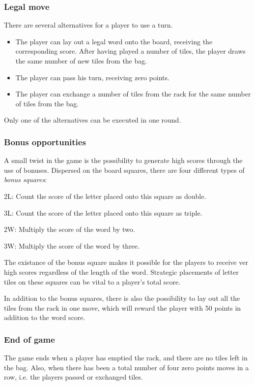 \documentclass[a4paper, 12pt]{report}
\begin{document}
\subsubsection{Legal move}
There are several alternatives for a player to use a turn. 
\begin{itemize}
\item The player can lay out a legal word onto the board, receiving the corresponding score. After having played a number of tiles, the player draws the same number of new tiles from the bag.
\item The player can pass his turn, receiving zero points.
\item The player can exchange a number of tiles from the rack for the same number of tiles from the bag.
\end{itemize}

Only one of the alternatives can be executed in one round.

\subsubsection{Bonus opportunities}
A small twist in the game is the possibility to generate high scores through the use of bonuses. Dispersed on the board squares, there are four different types of \emph{bonus squares}:

\begin{description}
\item{2L:} Count the score of the letter placed onto this square as double.
\item{3L:} Count the score of the letter placed onto this square as triple.
\item{2W:} Multiply the score of the word by two.
\item{3W:} Multiply the score of the word by three.
\end{description}

The existance of the bonus square makes it possible for the players to receive ver high scores regardless of the length of the word. Strategic placements of letter tiles on these squares can be vital to a player's total score.

In addition to the bonus squares, there is also the possibility to lay out all the tiles from the rack in one move, which will reward the player with 50 points in addition to the word score.

\subsubsection{End of game}
The game ends when a player has emptied the rack, and there are no tiles left in the bag. Also, when there has been a total number of four zero points moves in a row, i.e. the players passed or exchanged tiles.
\end{document}
